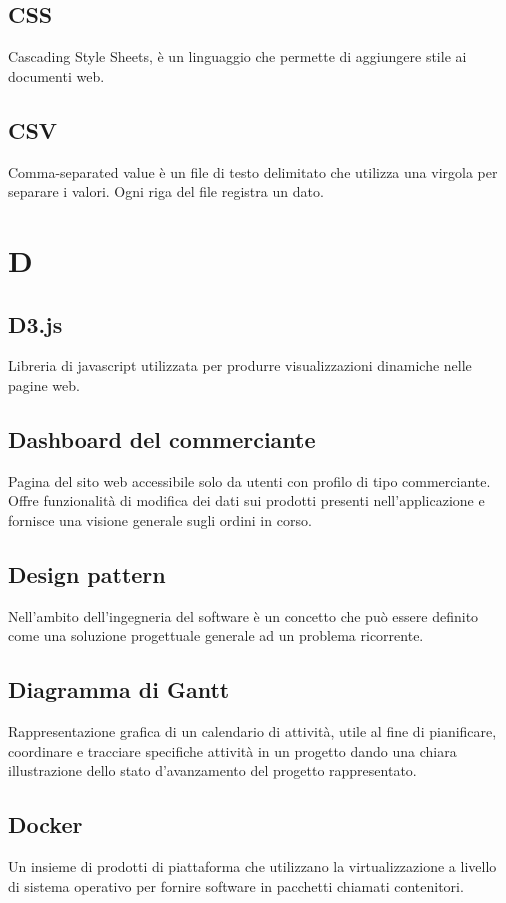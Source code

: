 \subsection*{CSS}
Cascading Style Sheets, è un linguaggio che permette di aggiungere stile ai documenti web.

\subsection*{CSV}
Comma-separated value è un file di testo delimitato che utilizza una virgola per separare i valori. Ogni riga del file registra un dato.

\newpage
\section{D}
\subsection*{D3.js}
Libreria di javascript utilizzata per produrre visualizzazioni dinamiche nelle pagine web.

\subsection*{Dashboard del commerciante}
Pagina del sito web accessibile solo da utenti con profilo di tipo commerciante. Offre funzionalità di modifica dei dati sui prodotti presenti nell'applicazione e fornisce una visione generale sugli ordini in corso.

\subsection*{Design pattern}
Nell’ambito dell’ingegneria del software è un concetto che può essere definito come una soluzione progettuale generale ad un problema ricorrente.

\subsection*{Diagramma di Gantt}
Rappresentazione grafica di un calendario di attività, utile al fine di pianificare, coordinare e tracciare specifiche attività in un progetto dando una chiara illustrazione dello stato d'avanzamento del progetto rappresentato.

\subsection*{Docker}
Un insieme di prodotti di piattaforma che utilizzano la virtualizzazione a livello di sistema operativo per fornire software in pacchetti chiamati contenitori.

